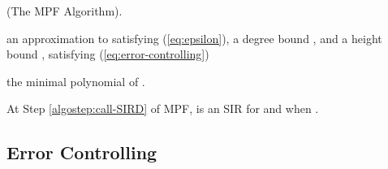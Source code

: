 \documentclass{sig-alternate}
\numberwithin{theorem}{section} \numberwithin{equation}{section}
\begin{document}
\begin{algorithm}[H]
\caption{(The MPF Algorithm).}
\begin{algorithmic}[1]
\REQUIRE an approximation  to  satisfying
(\ref{eq:epsilon}), a degree bound , and a height bound ,
 satisfying (\ref{eq:error-controlling})



\ENSURE the minimal polynomial of .

\WHILE{  }\label{algostep: circulating}

\STATE { }



\label{algostep:call-SIRD}













\label{algostep:if height(p)>H}















\ENDWHILE
\end{algorithmic}\label{algo:minimal-polynomial}
\end{algorithm}

\begin{rem}
At Step \ref{algostep:call-SIRD} of MPF,  is an SIR
for  and  when
 .
\end{rem}





















\subsection{Error Controlling}
\label{subsec:Finding the Minimal Polynomial Using Float-point
Arithmetic}
\end{document}
